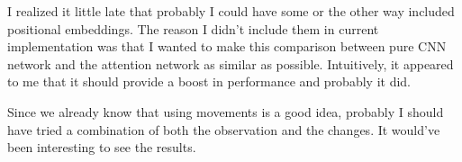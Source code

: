 \documentclass[english]{sobraep}
\begin{document}
I realized it little late that probably I could have some or the other way included positional embeddings. The reason I didn't include them in current implementation was that I wanted to make this comparison between pure CNN network and the attention network as similar as possible. Intuitively, it appeared to me that it should provide a boost in performance and probably it did.

Since we already know that using movements is a good idea, probably I should have tried a combination of both the observation and the changes. It would've been interesting to see the results.





\end{document}
